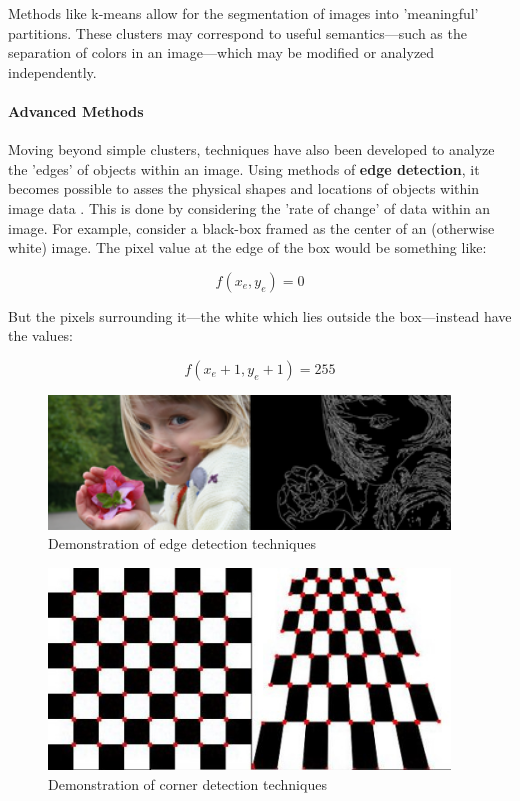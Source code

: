 \documentclass{report}
\newcommand{\tech}[1]{\textbf{#1}}
\begin{document}
Methods like k-means allow for the segmentation of images into 'meaningful' partitions. These clusters may correspond to useful semantics---such as the separation of colors in an image---which may be modified or analyzed independently.

\paragraph{Advanced Methods} Moving beyond simple clusters, techniques have also been developed to analyze the 'edges' of objects within an image. Using methods of \tech{edge detection}, it becomes possible to asses the physical shapes and locations of objects within image data \cite{ziou1998edge}. This is done by considering the 'rate of change' of data within an image. For example, consider a black-box framed as the center of an (otherwise white) image. The pixel value at the edge of the box would be something like:

$$f(x_{e}, y_{e}) = 0$$ 

But the pixels surrounding it---the white which lies outside the box---instead have the values:

$$
f(x_e + 1, y_e + 1) = 255
$$


\begin{figure}
    \centering
    \includegraphics[width=0.95\textwidth]{edge.png}
    \caption{Demonstration of edge detection techniques \cite{edge} }
    \label{fig:edge}
\end{figure}

\begin{figure}
    \centering
    \includegraphics[width=0.95\textwidth]{corner.jpg}
    \caption{Demonstration of corner detection techniques \cite{corner}}
    \label{fig:corner}
\end{figure}
\end{document}
